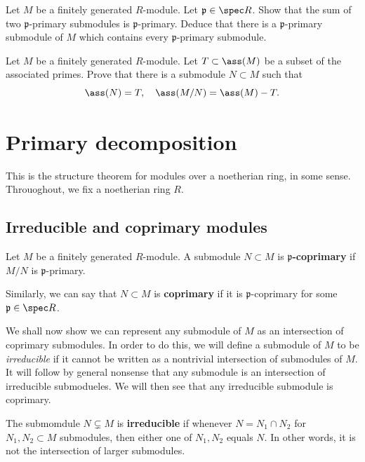 \begin{exercise} 
Let $M$ be a finitely generated $R$-module. Let $\mathfrak{p} \in \spec R$. Show that the sum of two
$\mathfrak{p}$-primary  submodules is $\mathfrak{p}$-primary. Deduce that
there is a $\mathfrak{p}$-primary submodule of $M$ which contains every
$\mathfrak{p}$-primary submodule. 
\end{exercise} 

\begin{exercise}[Bourbaki]
Let $M$ be a finitely generated $R$-module. Let $T \subset \ass(M)$ be a
subset of the associated primes. Prove that there is a submodule $N \subset M$
such that 
\[ \ass(N) = T, \quad \ass(M/N) = \ass(M) - T.  \]

\end{exercise} 

\section{Primary decomposition} This is the structure theorem for modules
over a noetherian ring, in some sense.
Throuoghout, we fix a noetherian ring $R$.

\subsection{Irreducible and coprimary modules}

\begin{definition} 
Let $M$ be a finitely generated $R$-module. A submodule $N \subset M$ is
\textbf{$\mathfrak{p}$-coprimary} if $M/N$ is $\mathfrak{p}$-primary.

Similarly, we can say that $N \subset M$ is \textbf{coprimary} if it is
$\mathfrak{p}$-coprimary for some $\mathfrak{p} \in \spec R$.
\end{definition} 

We shall now show we can represent any submodule of $M$ as an intersection of
coprimary submodules. In order to do this, we will define a submodule of $M$ to be
\emph{irreducible} if it cannot be written as a nontrivial intersection of
submodules of $M$. It
will follow by general nonsense that any submodule is an intersection of
irreducible submodueles. We will then see that any irreducible submodule is
coprimary. 

\begin{definition} 
The submomdule $N \subsetneq M$ is \textbf{irreducible} if whenever $N = N_1 \cap N_2$ for $N_1,
N_2 \subset M$ submodules, then either one of $N_1, N_2$ equals $N$. In other words, it is not
 the intersection of larger submodules. 
\end{definition} 

